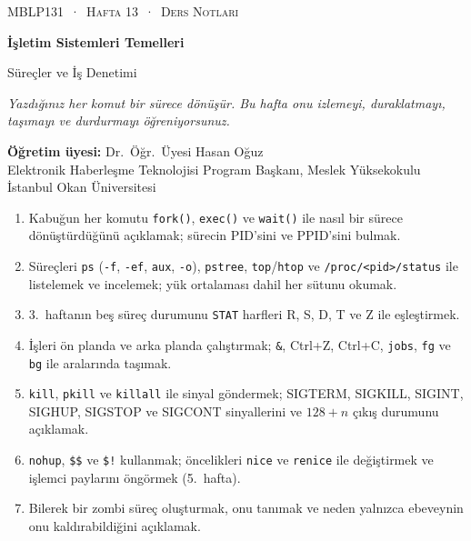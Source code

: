 \documentclass[11pt,a4paper]{article}
\newcommand{\cmd}[1]{\texttt{#1}}
\begin{document}
\setlength{\emergencystretch}{3em}
\lstset{tabsize=8}
\thispagestyle{empty}
\begin{tcolorbox}[enhanced,colback=dark,colframe=dark,arc=0pt,boxrule=0pt,
  left=18pt,right=18pt,top=20pt,bottom=20pt,coltext=white]
{\small\color{mint}\textsc{MBLP131 \,·\, Hafta 13 \,·\, Ders Notları}}\par\medskip
{\headfont\fontsize{26}{30}\selectfont\bfseries İşletim Sistemleri Temelleri}\par\medskip
{\large Süreçler ve İş Denetimi}\par\smallskip
{\small\itshape\color{white!70} Yazdığınız her komut bir sürece dönüşür. Bu hafta onu izlemeyi, duraklatmayı, taşımayı ve durdurmayı öğreniyorsunuz.}
\end{tcolorbox}

\vspace{0.4em}
\begin{minipage}[t]{0.70\linewidth}
\small
\textbf{Öğretim üyesi:} Dr.\ Öğr.\ Üyesi Hasan Oğuz\\
Elektronik Haberleşme Teknolojisi Program Başkanı, Meslek Yüksekokulu\\
İstanbul Okan Üniversitesi
\end{minipage}

\vspace{0.8em}
\begin{keyidea}
\begin{enumerate}[leftmargin=1.4em]
  \item Kabuğun her komutu \cmd{fork()}, \cmd{exec()} ve \cmd{wait()} ile nasıl bir sürece dönüştürdüğünü açıklamak; sürecin PID'sini ve PPID'sini bulmak.
  \item Süreçleri \cmd{ps} (\cmd{-f}, \cmd{-ef}, \cmd{aux}, \cmd{-o}), \cmd{pstree}, \cmd{top}/\cmd{htop} ve \texttt{/proc/<pid>/status} ile listelemek ve incelemek; yük ortalaması dahil her sütunu okumak.
  \item 3.~haftanın beş süreç durumunu \texttt{STAT} harfleri R, S, D, T ve Z ile eşleştirmek.
  \item İşleri ön planda ve arka planda çalıştırmak; \texttt{\&}, Ctrl+Z, Ctrl+C, \cmd{jobs}, \cmd{fg} ve \cmd{bg} ile aralarında taşımak.
  \item \cmd{kill}, \cmd{pkill} ve \cmd{killall} ile sinyal göndermek; SIGTERM, SIGKILL, SIGINT, SIGHUP, SIGSTOP ve SIGCONT sinyallerini ve $128 + n$ çıkış durumunu açıklamak.
  \item \cmd{nohup}, \verb|$$| ve \verb|$!| kullanmak; öncelikleri \cmd{nice} ve \cmd{renice} ile değiştirmek ve işlemci paylarını öngörmek (5.~hafta).
  \item Bilerek bir zombi süreç oluşturmak, onu tanımak ve neden yalnızca ebeveynin onu kaldırabildiğini açıklamak.
\end{enumerate}
\end{keyidea}
\end{document}
